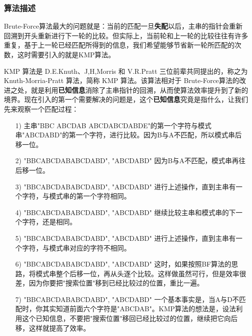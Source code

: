 \documentclass[UTF8]{ctexart}
\begin{document}
\subsubsection {算法描述}

Brute-Force算法最大的问题就是：当前的匹配一旦\textbf{失配}以后，主串的指针会重新回溯到开头重新进行下一轮的比较。但实际上，当前轮和上一轮的比较往往有许多重复，基于上一轮已经匹配所得到的信息，我们希望能够节省新一轮所匹配的次数，这时需要引入的就是KMP算法。 \par
KMP 算法是 D.E.Knuth、J,H,Morris 和 V.R.Pratt 三位前辈共同提出的，称之为 Knuth-Morria-Pratt 算法，简称 KMP 算法。该算法相对于 Brute-Force算法的改进之处，就是利用\textbf{已知信息}消除了主串指针的回溯，从而使算法效率提升到了新的境界。现在引入的第一个需要解决的问题是，这个\textbf{已知信息}究竟是指什么，让我们先来观察一个匹配过程：\par
\begin{itemize}
  \item [1)] 
  主串"\textcolor[rgb]{1,0,0}{B}BC ABCDAB ABCDABCDABDE"的第一个字符与模式串"\textcolor[rgb]{1,0,0}{A}BCDABD"的第一个字符，进行比较。因为B与A不匹配，所以模式串后移一位。
  \item [2)]
  "B\textcolor[rgb]{1,0,0}{B}CABCDABABCDABD", "\textcolor[rgb]{1,0,0}{A}BCDABD" 因为B与A不匹配，模式串再往后移一位。
  \item [3)]
  "BBC\textcolor[rgb]{1,0,0}{A}BCDABABCDABD", "\textcolor[rgb]{1,0,0}{A}BCDABD" 进行上述操作，直到主串有一个字符，与模式串的第一个字符相同。
  \item [4)]
  "BBC\textcolor[rgb]{1,0,0}{AB}CDABABCDABD", "\textcolor[rgb]{1,0,0}{AB}CDABD" 继续比较主串和模式串的下一个字符，还是相同。
  \item [5)]
  "BBC\textcolor[rgb]{1,0,0}{ABCDAB}\textcolor[rgb]{0,0,1}{A}BCDABD", "\textcolor[rgb]{1,0,0}{ABCDAB}\textcolor[rgb]{0,0,1}{D}" 进行上述操作，直到主串有一个字符，与模式串对应的字符不相同。
  \item [6)]
  "BBCA\textcolor[rgb]{1,0,0}{B}CDABABCDABD", "\textcolor[rgb]{1,0,0}{A}BCDABD" 这时，如果按照BF算法的思路，将模式串整个后移一位，再从头逐个比较。这样做虽然可行，但是效率很差，因为你要把"搜索位置"移到已经比较过的位置，重比一遍。
  \item [7)]
  "BBC\textcolor[rgb]{1,0,0}{ABCDAB}\textcolor[rgb]{0,0,1}{A}BCDABD", "\textcolor[rgb]{1,0,0}{ABCDAB}\textcolor[rgb]{0,0,1}{D}" 一个基本事实是，当A与D不匹配时，你其实知道前面六个字符是"ABCDAB"。KMP算法的想法是，设法利用这个已知信息，不要把"搜索位置"移回已经比较过的位置，继续把它向后移，这样就提高了效率。
\end{itemize}
\end{document}
